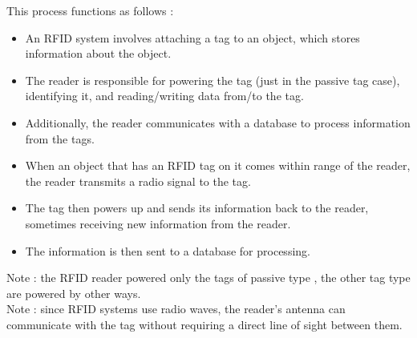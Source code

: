 This process functions as follows :\cite{li2018flooding}
\begin{itemize}
	\item An RFID system involves attaching a tag to an object, which stores information about the object.
	\item The reader is responsible for powering the tag (just in the passive tag case), identifying it, and reading/writing data from/to the tag.
	\item Additionally, the reader communicates with a database to process information from the tags.
	\item When an object that has an RFID tag on it comes within range of the reader, the reader transmits a radio signal to the tag.
	\item The tag then powers up and sends its information back to the reader, sometimes receiving new information from the reader.
	\item The information is then sent to a database for processing.
	
\end{itemize}
Note : the RFID reader powered only the tags of passive type , the other tag type are powered by other ways.\cite{li2018flooding}\\
Note : since RFID systems use radio waves, the reader's antenna can communicate with the tag without requiring a direct line of sight between them.\cite{li2018flooding}

